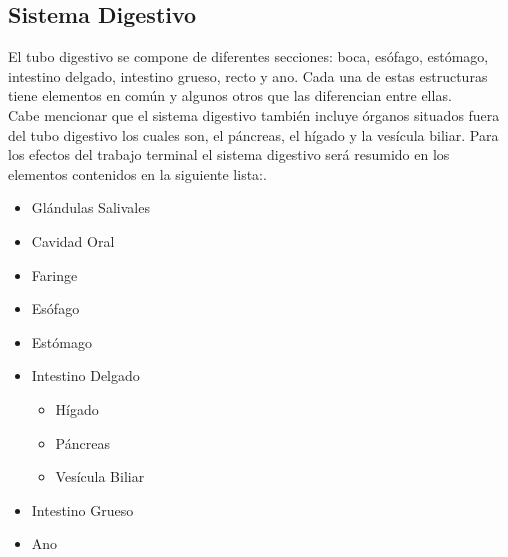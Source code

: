 \subsection{Sistema Digestivo}
El tubo digestivo se compone de diferentes secciones: boca, esófago, estómago, intestino delgado, intestino grueso, recto y ano. Cada una de estas estructuras tiene 
elementos en común y algunos otros que las diferencian entre ellas.\cite{rouviere2005anatomia}\\ 
Cabe mencionar que el sistema digestivo también incluye órganos situados fuera del tubo digestivo los cuales son, el páncreas, el hígado y la vesícula biliar. Para 
los efectos del trabajo terminal el sistema digestivo será resumido en los elementos contenidos en la siguiente lista:\cite{rohen2018anatomy2}.\\
\begin{itemize}
  \item Glándulas Salivales
  \item Cavidad Oral
  \item Faringe
  \item Esófago
  \item Estómago
  \item Intestino Delgado
  \begin{itemize}
    \item Hígado
    \item Páncreas
    \item Vesícula Biliar
  \end{itemize}
  \item Intestino Grueso
  \item Ano  
\end{itemize}

